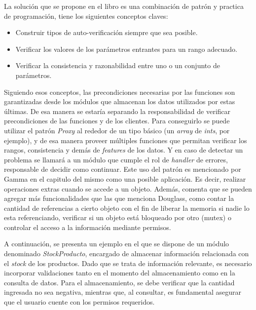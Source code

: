La solución que se propone en el libro es una combinación de patrón y practica de programación, tiene los siguientes conceptos claves:

\begin{itemize}
    \item Construir tipos de auto-verificación siempre que sea posible.
    \item Verificar los valores de los parámetros entrantes para un rango adecuado.
    \item Verificar la consistencia y razonabilidad entre uno o un conjunto de parámetros.
\end{itemize}

Siguiendo esos conceptos, las precondiciones necesarias por las funciones son garantizadas desde los módulos que almacenan los datos utilizados por estas últimas. De esa manera se estaría separando la responsabilidad de verificar precondiciones de las funciones y de los clientes. Para conseguirlo se puede utilizar el patrón \textit{Proxy} al rededor de un tipo básico (un \textit{array} de \textit{ints}, por ejemplo), y de esa manera proveer múltiples funciones que permitan verificar los rangos, consistencia y demás de \textit{features} de los datos. Y en caso de detectar un problema se llamará a un módulo que cumple el rol de \textit{handler} de errores, responsable de decidir como continuar. Este uso del patrón es mencionado por Gamma en el capitulo del mismo como una posible aplicación. Es decir, realizar operaciones extras cuando se accede a un objeto. Además, comenta que se pueden agregar más funcionalidades que las que menciona Douglass, como contar la cantidad de referencias a cierto objeto con el fin de liberar la memoria si nadie lo esta referenciando, verificar si un objeto está bloqueado por otro (mutex) o controlar el acceso a la información mediante permisos.

A continuación, se presenta un ejemplo en el que se dispone de un módulo denominado \textit{StockProducto}, encargado de almacenar información relacionada con el \textit{stock} de los productos. Dado que se trata de información relevante, es necesario incorporar validaciones tanto en el momento del almacenamiento como en la consulta de datos. Para el almacenamiento, se debe verificar que la cantidad ingresada no sea negativa, mientras que, al consultar, es fundamental asegurar que el usuario cuente con los permisos requeridos.

